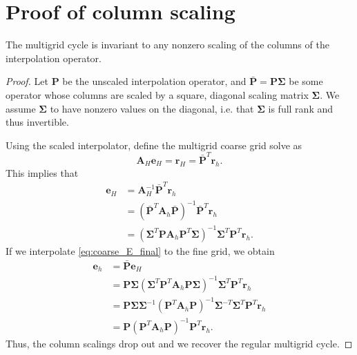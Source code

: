 \documentclass{article}
\newcommand{\mat}[1]{\bm{{#1}}}
\begin{document}
\section{Proof of column scaling}\label{sec:scaling_proof}
The multigrid cycle is invariant to any nonzero scaling of the columns of the interpolation operator.
\begin{proof}
  Let $\mat{P}$ be the unscaled interpolation operator, and $\mat{\bar{P}} = \mat{P} \mat{\Sigma}$ be some operator whose columns are scaled by a square, diagonal scaling matrix $\mat{\Sigma}$.  We assume $\mat{\Sigma}$ to have nonzero values on the diagonal, i.e. that $\mat{\Sigma}$ is full rank and thus invertible.

  Using the scaled interpolator, define the multigrid coarse grid solve as
  \begin{equation}
    \mat{A}_H\mat{e}_H = \mat{r}_H = \mat{\bar{P}}^T\mat{r}_h.
  \end{equation}
  This implies that
  \begin{align}
    \mat{e}_H &= \mat{A}_H^{-1} \mat{\bar{P}}^T\mat{r}_h \\
              &= \left( \mat{\bar{P}}^T \mat{A}_h \mat{\bar{P}} \right)^{-1} \mat{\bar{P}}^T \mat{r}_h \\
              &= \left( \mat{\Sigma}^T \mat{P} \mat{A}_h \mat{P}^T \mat{\Sigma} \right)^{-1} \mat{\Sigma}^T \mat{P}^T \mat{r}_h. \label{eq:coarse_E_final}
  \end{align}
  If we interpolate \eqref{eq:coarse_E_final} to the fine grid, we obtain
  \begin{align}
    \mat{e}_h &= \mat{\bar{P}} \mat{e}_H \\
              &= \mat{P} \mat{\Sigma} \left( \mat{\Sigma}^T \mat{P}^T \mat{A}_h \mat{P} \mat{\Sigma} \right)^{-1} \mat{\Sigma}^T \mat{P}^T \mat{r}_h \\
              &= \mat{P} \mat{\Sigma} \mat{\Sigma}^{-1} \left( \mat{P}^T \mat{A}_h \mat{P} \right)^{-1} \mat{\Sigma}^{-T} \mat{\Sigma}^T \mat{P}^T \mat{r}_h \\
              &= \mat{P} \left( \mat{P}^T \mat{A}_h \mat{P} \right)^{-1}\mat{P}^T \mat{r}_h.
  \end{align}
  Thus, the column scalings drop out and we recover the regular multigrid cycle.
\end{proof}

\nocite{*}


\end{document}
